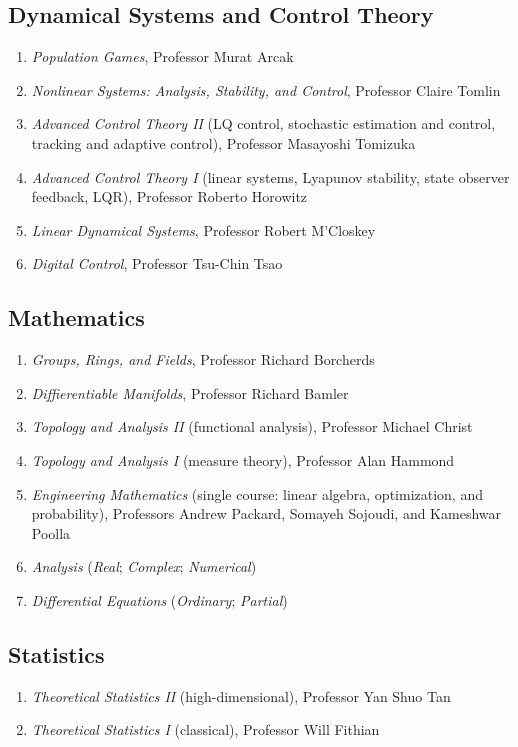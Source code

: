 \documentclass[11pt]{article}
\newcommand{\subsectionskip}{\baselineskip}	%
\begin{document}
\begin{coursework}
		\vspace*{\subsectionskip}
		
		\subsection{Dynamical Systems and Control Theory}
		\begin{enumerate}[label=\arabic*.]
			\item \textit{Population Games}, Professor Murat Arcak
			\item \textit{Nonlinear Systems: Analysis, Stability, and Control}, Professor Claire Tomlin
			\item \textit{Advanced Control Theory II} (LQ control, stochastic estimation and control, tracking and adaptive control), Professor Masayoshi Tomizuka
			\item \textit{Advanced Control Theory I} (linear systems, Lyapunov stability, state observer feedback, LQR), Professor Roberto Horowitz
			\item \textit{Linear Dynamical Systems}, Professor Robert M'Closkey
			\item \textit{Digital Control}, Professor Tsu-Chin Tsao
		\end{enumerate}
		
		\vspace*{\subsectionskip}
		
		\subsection{Mathematics}
		\begin{enumerate}[label=\arabic*.]
			\item \textit{Groups, Rings, and Fields}, Professor Richard Borcherds
			\item \textit{Diffierentiable Manifolds}, Professor Richard Bamler
			\item \textit{Topology and Analysis II} (functional analysis), Professor Michael Christ
			\item \textit{Topology and Analysis I} (measure theory), Professor Alan Hammond
			\item \textit{Engineering Mathematics} (single course: linear algebra, optimization, and probability), Professors Andrew Packard, Somayeh Sojoudi, and Kameshwar Poolla
			\item \textit{Analysis} (\textit{Real}; \textit{Complex}; \textit{Numerical})
			\item \textit{Differential Equations} (\textit{Ordinary}; \textit{Partial})
		\end{enumerate}
		
		\vspace*{\subsectionskip}

		\subsection{Statistics}
		\begin{enumerate}[label=\arabic*.]
			\item \textit{Theoretical Statistics II} (high-dimensional), Professor Yan Shuo Tan
			\item \textit{Theoretical Statistics I} (classical), Professor Will Fithian
		\end{enumerate}
	\end{coursework}
	
\end{document}
